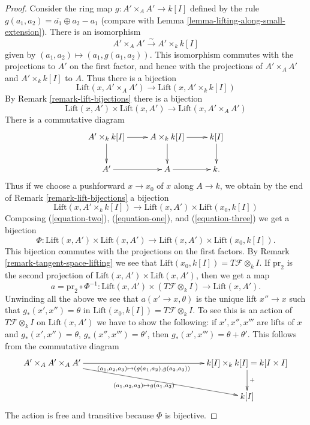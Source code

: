 \begin{proof}
Consider the ring map $g : A' \times_A A' \to k[I]$ defined by the
rule $g(a_1, a_2) = \overline{a_1} \oplus a_2 - a_1$ (compare with
Lemma \ref{lemma-lifting-along-small-extension}).
There is an isomorphism
$$
A' \times_A A' \xrightarrow{\sim} A' \times_k k[I]
$$
given by $(a_1, a_2) \mapsto (a_1, g(a_1, a_2))$.
This isomorphism commutes with the projections to $A'$ on the first
factor, and hence with the projections of
$A' \times_A A'$ and $A' \times_k k[I]$ to $A$. Thus there is a bijection
\begin{equation}
\label{equation-one}
\text{Lift}(x, A' \times_A A')
\longrightarrow
\text{Lift}(x, A' \times_k k[I])
\end{equation}
By Remark \ref{remark-lift-bijections} there is a bijection
\begin{equation}
\label{equation-two}
\text{Lift}(x, A') \times \text{Lift}(x, A')
\longrightarrow
\text{Lift}(x, A' \times_A A')
\end{equation}
There is a commutative diagram
$$
\xymatrix{
A' \times_k k[I] \ar[r] \ar[d] & A \times_k k[I] \ar[r] \ar[d] & k[I] \ar[d] \\
A' \ar[r] & A \ar[r] & k.
}
$$
Thus if we choose a pushforward $x \to x_0$ of $x$ along
$A \to k$, we obtain by the end of
Remark \ref{remark-lift-bijections}
a bijection
\begin{equation}
\label{equation-three}
\text{Lift}(x, A' \times_k k[I])
\longrightarrow
\text{Lift}(x, A') \times \text{Lift}(x_0, k[I])
\end{equation}
Composing (\ref{equation-two}), (\ref{equation-one}), and
(\ref{equation-three})
we get a bijection
$$
\Phi :
\text{Lift}(x, A') \times \text{Lift}(x, A')
\longrightarrow
\text{Lift}(x, A') \times \text{Lift}(x_0, k[I]).
$$
This bijection commutes with the projections on the first factors.
By Remark \ref{remark-tangent-space-lifting}
we see that $\text{Lift}(x_0, k[I]) = T\mathcal{F} \otimes_k I$.
If $\text{pr}_2$ is the second projection of
$\text{Lift}(x, A') \times \text{Lift}(x, A')$, then we get a map
$$
a = \text{pr}_2 \circ \Phi^{-1} :
\text{Lift}(x, A') \times (T\mathcal{F} \otimes_k I)
\longrightarrow
\text{Lift}(x, A').
$$
Unwinding all the above we see that $a(x' \to x, \theta)$
is the unique lift $x'' \to x$ such that $g_*(x', x'') = \theta$
in $\text{Lift}(x_0, k[I]) = T\mathcal{F} \otimes_k I$.
To see this is an action of $T\mathcal{F} \otimes_k I$ on $\text{Lift}(x, A')$
we have to show the following: if $x', x'', x'''$ are lifts of $x$ and
$g_*(x', x'') = \theta$, $g_*(x'', x''') = \theta'$, then
$g_*(x', x''') = \theta + \theta'$. This follows from the commutative
diagram
$$
\xymatrix{
A' \times_A A' \times_A A'
\ar[rrrrr]_-{(a_1, a_2, a_3) \mapsto (g(a_1, a_2), g(a_2, a_3))}
\ar[rrrrrd]_{(a_1, a_2, a_3) \mapsto g(a_1, a_3)} & & & & &
k[I] \times_k k[I] = k[I \times I] \ar[d]^{+} \\
& & & & & k[I]
}
$$
The action is free and transitive because $\Phi$ is bijective.
\end{proof}

